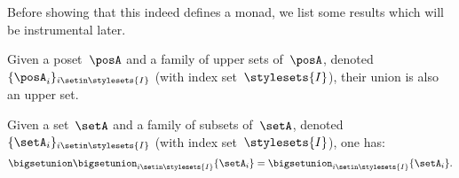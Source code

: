 Before showing that this indeed defines a monad, we list some results which will be instrumental later.
\begin{lemma}
    \label{lem:upperunionupper}
    Given a poset~$\posA$ and a family of upper sets of~$\posA$, denoted~$\{\posA_i\}_{i\setin \stylesets{I}}$ (with index set~$\stylesets{I}$), their union is also an upper set.
\end{lemma}

\begin{lemma}
    \label{lem:setunionset}
    Given a set~$\setA$ and a family of subsets of~$\setA$, denoted~$\{\setA_i\}_{i\setin \stylesets{I}}$ (with index set~$\stylesets{I}$), one has:
    \begin{equation}
        \bigsetunion \bigsetunion_{i\setin \stylesets{I}}\{\setA_i\} = \bigsetunion_{i\setin \stylesets{I}}\{\setA_i\}.
    \end{equation}
\end{lemma}


